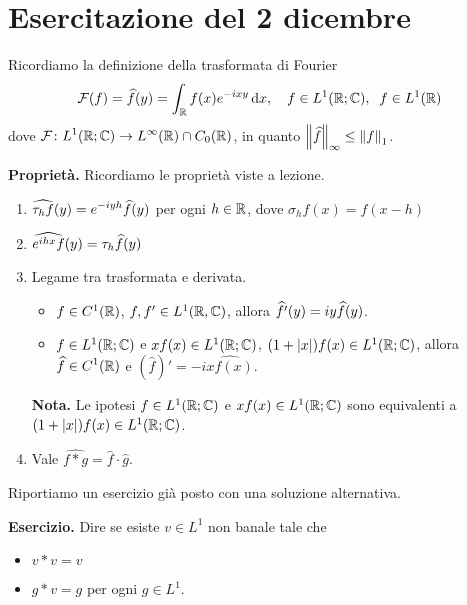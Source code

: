 \section{Esercitazione del 2 dicembre}

Ricordiamo la definizione della trasformata di Fourier
%
$$
	\mathcal{F}(f) = \widehat{f}(y) = \int_{\mathbb R} f(x) e^{-ixy} \,\mathrm{d} x, \quad f \in L^1(\mathbb R;\mathbb C), \;\; f \in L^1(\mathbb R)
$$
%
dove $\displaystyle \mathcal{F} \colon L^1(\mathbb R;\mathbb C) \to L^\infty(\mathbb R) \cap C_0(\mathbb R)$, in quanto $\left\lVert \widehat{f} \right\rVert_\infty \leq \left\lVert f \right\rVert_1$.


\textbf{Proprietà.} Ricordiamo le proprietà viste a lezione.

\begin{enumerate}
	\item $\displaystyle \widehat{\tau_h f}(y) = e^{-iyh} \widehat{f}(y)$ per ogni $h \in \mathbb R$, dove $\sigma_h f(x) = f(x - h)$


	\item $\displaystyle \widehat{e^{ihx} f}(y) = \tau_h \widehat{f}(y) $


	\item Legame tra trasformata e derivata.

	\begin{itemize}

		\item $f \in C^1(\mathbb R)$, $f,f' \in L^1(\mathbb R,\mathbb C)$, allora $\displaystyle \widehat{f'}(y) = iy \widehat{f}(y)$.


		\item $f \in L^1(\mathbb R;\mathbb C)$ e $xf(x) \in L^1(\mathbb R;\mathbb C)$, $(1 + |x|) f(x) \in L^1(\mathbb R;\mathbb C)$, allora $\displaystyle \widehat{f} \in C^1(\mathbb R)$ e $(\hat{f})' = -i \hat{xf(x)}$.

	\end{itemize}

	\textbf{Nota.} Le ipotesi $f \in L^1(\mathbb R;\mathbb C)$ e $xf(x) \in L^1(\mathbb R;\mathbb C)$ sono equivalenti a $(1 + |x|) f(x) \in L^1(\mathbb R;\mathbb C)$.


	\item  Vale $\hat{f \ast g} = \hat{f} \cdot \hat{g}$.
	
\end{enumerate}

Riportiamo un esercizio già posto con una soluzione alternativa. 

\textbf{Esercizio.} Dire se esiste $v \in L^1$ non banale tale che 
\begin{itemize}

	\item $v \ast v = v$

	\item $g \ast v = g$ per ogni $g \in L^1$.

\end{itemize}

